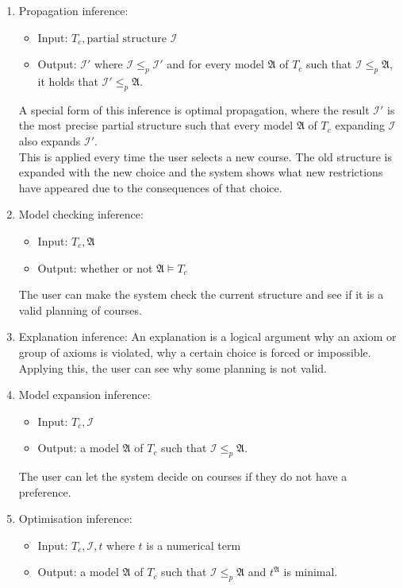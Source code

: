 \documentclass[10pt,a4paper]{article}
\theoremstyle{definition}
\begin{document}
\begin{enumerate}
	\item Propagation inference: 
		\begin{itemize}
			\item Input: $T_c,  \text{partial structure } \mathcal{I}$
			\item Output: $\mathcal{I}'$ where $\mathcal{I} \leq_p \mathcal{I}'$ and for every model $\mathfrak{A}$ of $T_c$ such that $\mathcal{I} \leq_p\mathfrak{A}$, it holds that $\mathcal{I}' \leq_p \mathfrak{A}$. 
		\end{itemize}
		A special form of this inference is optimal propagation, where the result $\mathcal{I}'$ is the most precise partial structure such that every model $\mathfrak{A}$ of $T_c$ expanding $\mathcal{I}$ also expands $\mathcal{I}'$.\\
	
	This is applied every time the user selects a new course. The old structure is expanded with the new choice and the system shows what new restrictions have appeared due to the consequences of that choice.
	\item Model checking inference: 			\begin{itemize}
			\item Input: $T_c, \mathfrak{A}$
			\item Output: whether or not $\mathfrak{A} \models T_c$
		\end{itemize}
		
	The user can make the system check the current structure and see if it is a valid planning of courses.
	\item Explanation inference: An explanation is a logical argument why an axiom or group of axioms is violated, why a certain choice is forced or impossible.\\
	
	Applying this, the user can see why some planning is not valid.	
	\item Model expansion inference:
		\begin{itemize}
			\item Input: $T_c, \mathcal{I}$
			\item Output: a model $\mathfrak{A}$ of $T_c$ such that $\mathcal{I} \leq_p \mathfrak{A}$. 
		\end{itemize}
		
	The user can let the system decide on courses if they do not have a preference.
	\item Optimisation inference:
		\begin{itemize}
			\item Input: $T_c, \mathcal{I},t$ where $t$ is a numerical term
			\item Output: a model $\mathfrak{A}$ of $T_c$ such that $\mathcal{I} \leq_p \mathfrak{A}$ and $t^\mathfrak{A}$ is minimal. 
		\end{itemize}
		

\end{enumerate}
\end{document}
